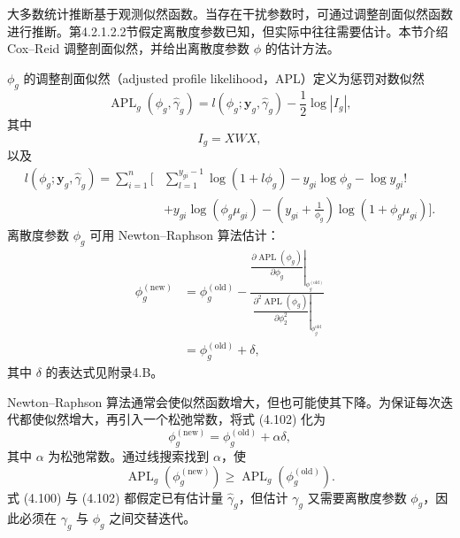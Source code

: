 大多数统计推断基于观测似然函数。当存在干扰参数时，可通过调整剖面似然函数进行推断。第4.2.1.2.2节假定离散度参数已知，但实际中往往需要估计。本节介绍 Cox–Reid 调整剖面似然，并给出离散度参数 $\phi$ 的估计方法。

$\phi_g$ 的调整剖面似然（adjusted profile likelihood，APL）定义为惩罚对数似然
\[
\operatorname{APL}_g(\phi_g,\hat\gamma_g)
=l(\phi_g;\mathbf y_g,\hat\gamma_g)-\frac12\log|I_g|,
\]
其中
\[
I_g=XWX,
\]
以及
\[
\begin{aligned}
l(\phi_g;\mathbf y_g,\hat\gamma_g)
=\sum_{i=1}^{n}\biggl[{}&\sum_{l=1}^{y_{gi}-1}\log(1+l\phi_g)
-y_{gi}\log\phi_g-\log y_{gi}!\\
&+y_{gi}\log(\phi_g\mu_{gi})
-\left(y_{gi}+\frac1{\phi_g}\right)\log(1+\phi_g\mu_{gi})\biggr].
\end{aligned}
\]
离散度参数 $\phi_g$ 可用 Newton–Raphson 算法估计：
\begin{equation}
\begin{aligned}
\phi_g^{(\mathrm{new})}
&=\phi_g^{(\mathrm{old})}
-\frac{\left.\dfrac{\partial\operatorname{APL}(\phi_g)}{\partial\phi_g}\right|_{\phi_g^{(\mathrm{old})}}}
{\left.\dfrac{\partial^2\operatorname{APL}(\phi_g)}{\partial\phi_2^2}\right|_{\phi_g^{\mathrm{old}}}}\\
&=\phi_g^{(\mathrm{old})}+\delta,
\end{aligned}
\tag{4.102}
\end{equation}
其中 $\delta$ 的表达式见附录4.B。

Newton–Raphson 算法通常会使似然函数增大，但也可能使其下降。为保证每次迭代都使似然增大，再引入一个松弛常数，将式 (4.102) 化为
\begin{equation}
\phi_g^{(\mathrm{new})}=\phi_g^{(\mathrm{old})}+\alpha\delta,
\tag{4.103}
\end{equation}
其中 $\alpha$ 为松弛常数。通过线搜索找到 $\alpha$，使
\[
\operatorname{APL}_g(\phi_g^{(\mathrm{new})})\ge
\operatorname{APL}_g(\phi_g^{(\mathrm{old})}).
\]
式 (4.100) 与 (4.102) 都假定已有估计量 $\hat\gamma_g$，但估计 $\gamma_g$ 又需要离散度参数 $\phi_g$，因此必须在 $\gamma_g$ 与 $\phi_g$ 之间交替迭代。

